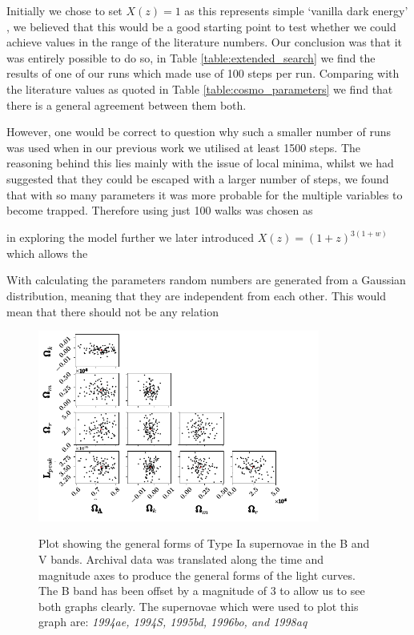 \documentclass[twocolumn]{revtex4}
\begin{document}
{{Initially we chose to set $X(z)=1$ as this represents simple `vanilla dark energy' \cite{cosmo_constraints}, we believed that this would be a good starting point to test whether we could achieve values in the range of the literature numbers. Our conclusion was that it was entirely possible to do so, in Table \ref{table:extended_search} we find the results of one of our runs which made use of 100 steps per run. Comparing with the literature values as quoted in Table \ref{table:cosmo_parameters} we find that there is a general agreement between them both. 

However, one would be correct to question why such a smaller number of runs was used when in our previous work we utilised at least 1500 steps. The reasoning behind this lies mainly with the issue of local minima, whilst we had suggested that they could be escaped with a larger number of steps, we found that with so many parameters it was more probable for the multiple variables to become trapped. Therefore using just 100 walks was chosen as  

in exploring the model further we later introduced $X(z)=(1+z)^{3(1+w)}$ which allows the  

With calculating the parameters random numbers are generated from a Gaussian distribution, meaning that they are independent from each other. This would mean that there should not be any relation



\begin{figure}[!h]
\begin{center}
\includegraphics[width=9.25cm]{results/triangle}
\caption[]{Plot showing the general forms of Type Ia supernovae in the B and V bands. Archival data was translated along the time and magnitude axes to produce the general forms of the light curves. The B band has been offset by a magnitude of $3$ to allow us to see both graphs clearly. The supernovae which were used to plot this graph are: \em{1994ae, 1994S, 1995bd, 1996bo, }\em  and \em{1998aq }\em  }
\vspace{-3ex}
\label{fig:triangle}
\end{center}
\end{figure}

}}
\end{document}
